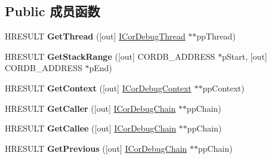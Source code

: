\subsection*{Public 成员函数}
\begin{DoxyCompactItemize}
\item 
\mbox{\label{interface_i_cor_debug_chain_a06fb15053e6ae6bb48d0e057ece87289}} 
H\+R\+E\+S\+U\+LT {\bfseries Get\+Thread} (\mbox{[}out\mbox{]} \hyperlink{interface_i_cor_debug_thread}{I\+Cor\+Debug\+Thread} $\ast$$\ast$pp\+Thread)
\item 
\mbox{\label{interface_i_cor_debug_chain_adf440e27f7d1b797695f4b58710089c9}} 
H\+R\+E\+S\+U\+LT {\bfseries Get\+Stack\+Range} (\mbox{[}out\mbox{]} C\+O\+R\+D\+B\+\_\+\+A\+D\+D\+R\+E\+SS $\ast$p\+Start, \mbox{[}out\mbox{]} C\+O\+R\+D\+B\+\_\+\+A\+D\+D\+R\+E\+SS $\ast$p\+End)
\item 
\mbox{\label{interface_i_cor_debug_chain_a1b2041514cc48be70e3db3947a64beaf}} 
H\+R\+E\+S\+U\+LT {\bfseries Get\+Context} (\mbox{[}out\mbox{]} \hyperlink{interface_i_cor_debug_context}{I\+Cor\+Debug\+Context} $\ast$$\ast$pp\+Context)
\item 
\mbox{\label{interface_i_cor_debug_chain_a67796e960b00346170c2a0eb15cb681f}} 
H\+R\+E\+S\+U\+LT {\bfseries Get\+Caller} (\mbox{[}out\mbox{]} \hyperlink{interface_i_cor_debug_chain}{I\+Cor\+Debug\+Chain} $\ast$$\ast$pp\+Chain)
\item 
\mbox{\label{interface_i_cor_debug_chain_a2f765a28565557992839024ca814d587}} 
H\+R\+E\+S\+U\+LT {\bfseries Get\+Callee} (\mbox{[}out\mbox{]} \hyperlink{interface_i_cor_debug_chain}{I\+Cor\+Debug\+Chain} $\ast$$\ast$pp\+Chain)
\item 
\mbox{\label{interface_i_cor_debug_chain_a104577dc719f7a7a5c68755e1f4d818d}} 
H\+R\+E\+S\+U\+LT {\bfseries Get\+Previous} (\mbox{[}out\mbox{]} \hyperlink{interface_i_cor_debug_chain}{I\+Cor\+Debug\+Chain} $\ast$$\ast$pp\+Chain)
\item 
\mbox{\label{interface_i_cor_debug_chain_a0f0543dfc7f7dffd06d51a3c4a8fbef2}} 
$$
\end{DoxyCompactItemize}
